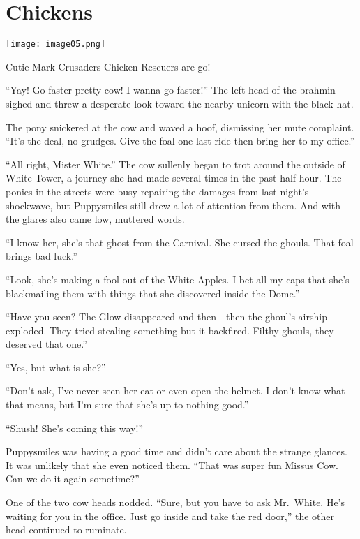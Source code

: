 
\chapter{Chickens}

\texttt{[image: image05.png]}

\begin{intro}
Cutie Mark Crusaders Chicken Rescuers are go!
\end{intro}



``Yay! Go faster pretty cow! I wanna go faster!'' The left head of the brahmin sighed and threw a desperate look toward the nearby unicorn with the black hat.

The pony snickered at the cow and waved a hoof, dismissing her mute complaint. ``It's the deal, no grudges. Give the foal one last ride then bring her to my office.''

``All right, Mister White.'' The cow sullenly began to trot around the outside of White Tower, a journey she had made several times in the past half hour. The ponies in the streets were busy repairing the damages from last night's shockwave, but Puppysmiles still drew a lot of attention from them. And with the glares also came low, muttered words.

``I know her, she's that ghost from the Carnival. She cursed the ghouls. That foal brings bad luck.''

``Look, she's making a fool out of the White Apples. I bet all my caps that she's blackmailing them with things that she discovered inside the Dome.''

``Have you seen? The Glow disappeared and then---then the ghoul's airship exploded. They tried stealing something but it backfired. Filthy ghouls, they deserved that one.''

``Yes, but what is she?''

``Don't ask, I've never seen her eat or even open the helmet. I don't know what that means, but I'm sure that she's up to nothing good.''

``Shush! She's coming this way!''

Puppysmiles was having a good time and didn't care about the strange glances. It was unlikely that she even noticed them. ``That was super fun Missus Cow. Can we do it again sometime?''

One of the two cow heads nodded. ``Sure, but you have to ask Mr.~White. He's waiting for you in the office. Just go inside and take the red door,'' the other head continued to ruminate.

